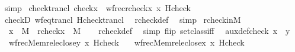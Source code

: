 \begin{isabellebody}
\ simp%
\endisatagproof
{\isafoldproof}%
%
\isadelimproof
\isanewline
%
\endisadelimproof
\isanewline
{}\isamarkupfalse%
\ check{\isacharunderscore}{\kern0pt}trancl{\isacharcolon}{\kern0pt}\ {\isachardoublequoteopen}check{\isacharparenleft}{\kern0pt}x{\isacharparenright}{\kern0pt}\ {\isacharequal}{\kern0pt}\ wfrec{\isacharparenleft}{\kern0pt}rcheck{\isacharparenleft}{\kern0pt}x{\isacharparenright}{\kern0pt}{\isacharcomma}{\kern0pt}\ x{\isacharcomma}{\kern0pt}\ Hcheck{\isacharparenright}{\kern0pt}{\isachardoublequoteclose}\isanewline
%
\isadelimproof
\ \ %
\endisadelimproof
%
\isatagproof
{}\isamarkupfalse%
\ checkD\ wf{\isacharunderscore}{\kern0pt}eq{\isacharunderscore}{\kern0pt}trancl\ Hcheck{\isacharunderscore}{\kern0pt}trancl\ \isamarkupfalse%
\ rcheck{\isacharunderscore}{\kern0pt}def\ \isamarkupfalse%
\ simp%
\endisatagproof
{\isafoldproof}%
%
\isadelimproof
\isanewline
%
\endisadelimproof
\isanewline
\isanewline
{}\isamarkupfalse%
\ rcheck{\isacharunderscore}{\kern0pt}in{\isacharunderscore}{\kern0pt}M\ {\isacharcolon}{\kern0pt}\isanewline
\ \ {\isachardoublequoteopen}x\ {\isasymin}\ M\ {\isasymLongrightarrow}\ rcheck{\isacharparenleft}{\kern0pt}x{\isacharparenright}{\kern0pt}\ {\isasymin}\ M{\isachardoublequoteclose}\isanewline
%
\isadelimproof
\ \ %
\endisadelimproof
%
\isatagproof
{}\isamarkupfalse%
\ rcheck{\isacharunderscore}{\kern0pt}def\ \isamarkupfalse%
\ {\isacharparenleft}{\kern0pt}simp\ flip{\isacharcolon}{\kern0pt}\ setclass{\isacharunderscore}{\kern0pt}iff{\isacharparenright}{\kern0pt}%
\endisatagproof
{\isafoldproof}%
%
\isadelimproof
\isanewline
%
\endisadelimproof
\isanewline
\isanewline
{}\isamarkupfalse%
\ \ aux{\isacharunderscore}{\kern0pt}def{\isacharunderscore}{\kern0pt}check{\isacharcolon}{\kern0pt}\ {\isachardoublequoteopen}x\ {\isasymin}\ y\ {\isasymLongrightarrow}\isanewline
\ \ wfrec{\isacharparenleft}{\kern0pt}Memrel{\isacharparenleft}{\kern0pt}eclose{\isacharparenleft}{\kern0pt}{\isacharbraceleft}{\kern0pt}y{\isacharbraceright}{\kern0pt}{\isacharparenright}{\kern0pt}{\isacharparenright}{\kern0pt}{\isacharcomma}{\kern0pt}\ x{\isacharcomma}{\kern0pt}\ Hcheck{\isacharparenright}{\kern0pt}\ {\isacharequal}{\kern0pt}\isanewline
\ \ wfrec{\isacharparenleft}{\kern0pt}Memrel{\isacharparenleft}{\kern0pt}eclose{\isacharparenleft}{\kern0pt}{\isacharbraceleft}{\kern0pt}x{\isacharbraceright}{\kern0pt}{\isacharparenright}{\kern0pt}{\isacharparenright}{\kern0pt}{\isacharcomma}{\kern0pt}\ x{\isacharcomma}{\kern0pt}\ Hcheck{\isacharparenright}{\kern0pt}{\isachardoublequoteclose}\isanewline

\end{isabellebody}
